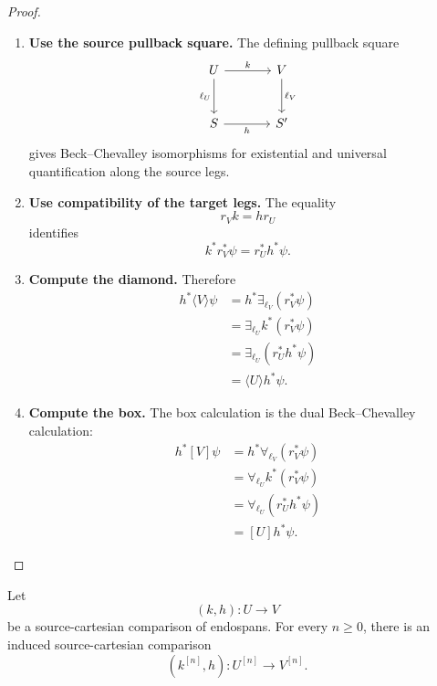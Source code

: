 \begin{proof}
\begin{enumerate}
  \item \textbf{Use the source pullback square.}
  The defining pullback square
  \[
  \begin{tikzcd}[column sep=large,row sep=large]
    U
      \ar[r,"k"]
      \ar[d,"\ell_U"']
    &
    V
      \ar[d,"\ell_V"]
    \\
    S
      \ar[r,"h"']
    &
    S'
  \end{tikzcd}
  \]
  gives Beck--Chevalley isomorphisms for existential and universal
  quantification along the source legs.

  \item \textbf{Use compatibility of the target legs.}
  The equality
  \[
    r_Vk=hr_U
  \]
  identifies
  \[
    k^\ast r_V^\ast\psi
    =
    r_U^\ast h^\ast\psi.
  \]

  \item \textbf{Compute the diamond.}
  Therefore
  \[
  \begin{aligned}
    h^\ast\langle V\rangle\psi
    &=
    h^\ast\exists_{\ell_V}(r_V^\ast\psi)
    \\
    &=
    \exists_{\ell_U}k^\ast(r_V^\ast\psi)
    \\
    &=
    \exists_{\ell_U}(r_U^\ast h^\ast\psi)
    \\
    &=
    \langle U\rangle h^\ast\psi.
  \end{aligned}
  \]

  \item \textbf{Compute the box.}
  The box calculation is the dual Beck--Chevalley calculation:
  \[
  \begin{aligned}
    h^\ast[V]\psi
    &=
    h^\ast\forall_{\ell_V}(r_V^\ast\psi)
    \\
    &=
    \forall_{\ell_U}k^\ast(r_V^\ast\psi)
    \\
    &=
    \forall_{\ell_U}(r_U^\ast h^\ast\psi)
    \\
    &=
    [U]h^\ast\psi.
  \end{aligned}
  \]
\end{enumerate}
\end{proof}

\begin{lemma}
\label{lem:iterated-source-cartesian-comparisons}
Let
\[
  (k,h):U\to V
\]
be a source-cartesian comparison of endospans. For every \(n\geq 0\), there is
an induced source-cartesian comparison
\[
  (k^{[n]},h):U^{[n]}\longrightarrow V^{[n]}.
\]
\end{lemma}

